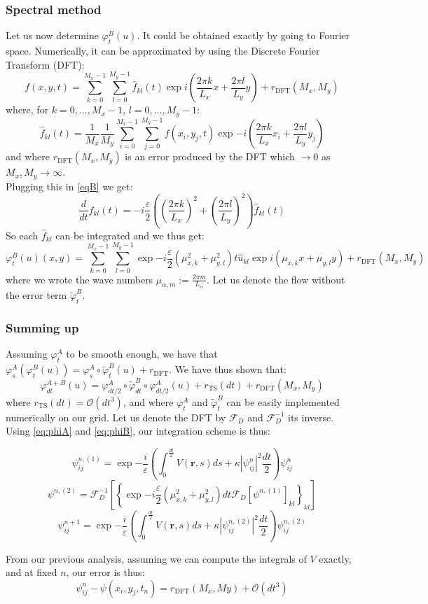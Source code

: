 \documentclass{article}
\begin{document}
\subsubsection*{Spectral method}
Let us now determine $\varphi^B_t(u)$. It could be obtained exactly by going to Fourier space. Numerically, it can be approximated by using the Discrete Fourier Transform (DFT):
$$
f(x,y,t)=\sum_{k=0}^{M_x-1}\sum_{l=0}^{M_y-1}\hat{f}_{kl}(t)\exp{i\left(\frac{2\pi k}{L_x}x+\frac{2\pi l}{L_y}y\right)}+r_\text{DFT}(M_x,M_y)
$$
where, for $k=0,..., M_x-1$, $l=0,..., M_y-1$:
$$
\hat{f}_{kl}(t)=\frac{1}{M_x}\frac{1}{M_y}\sum_{i=0}^{M_x-1}\sum_{j=0}^{M_y-1}f(x_i,y_j,t)\exp{-i\left(\frac{2\pi k}{L_x}x_i+\frac{2\pi l}{L_y}y_j\right)}
$$
and where $r_\text{DFT}(M_x,M_y)$ is an error produced by the DFT which $\longrightarrow0$ as $M_x,M_y\longrightarrow\infty$.\\
Plugging this in \eqref{eqB} we get:
$$
\frac{d}{dt}\hat{f}_{kl}(t)=-i\frac{\varepsilon}{2}\left(\left(\frac{2\pi k}{L_x}\right)^2+\left(\frac{2\pi l}{L_y}\right)^2\right)\hat{f}_{kl}(t)
$$
So each $\hat{f}_{kl}$ can be integrated and we thus get:
\begin{equation}\label{eq:phiB}
    \varphi^B_t(u)(x,y)=\sum_{k=0}^{M_x-1}\sum_{l=0}^{M_y-1}\exp{-i\frac{\varepsilon}{2}\left(\mu_{x,k}^2+\mu_{y,l}^2\right)t}\hat{u}_{kl}\exp{i\left(\mu_{x,k} x+\mu_{y,l} y\right)}+r_\text{DFT}(M_x,M_y)
\end{equation}
where we wrote the wave numbers $\mu_{\alpha,m}:=\frac{2\pi m}{L_\alpha}$. Let us denote the flow without the error term $\tilde{\varphi}_t^B$.

\subsubsection*{Summing up}
Assuming $\varphi_t^A$ to be smooth enough, we have that $\varphi_s^A(\varphi_t^B(u))=\varphi_s^A\circ\tilde{\varphi}_t^B(u)+r_\text{DFT}$. We have thus shown that:
$$\varphi^{A+B}_{dt}(u)=\varphi^A_{dt/2}\circ\tilde{\varphi}^B_{dt}\circ\varphi^A_{dt/2}(u)+r_\text{TS}(dt)+r_\text{DFT}(M_x,M_y)$$
where $r_\text{TS}(dt)=\mathcal{O}(dt^3)$, and where $\varphi^A_t$ and $\tilde {\varphi}^B_t$ can be easily implemented numerically on our grid. Let us denote the DFT by $\mathcal{F}_D$ and $\mathcal{F}_D^{-1}$ its inverse. Using \eqref{eq:phiA} and \eqref{eq:phiB}, our integration scheme is thus:
\begin{framed}
$$
\psi^{n,(1)}_{ij}=\exp{-\frac{i}{\varepsilon}\left(\int_0^\frac{dt}{2} V(\mathbf{r},s)ds +\kappa|\psi^n_{ij}|^{2}\frac{dt}{2}\right)}\psi^n_{ij}
$$
$$
\psi^{n,(2)}=\mathcal{F}_D^{-1}\left[\left\{\exp{-i\frac{\varepsilon}{2}\left(\mu_{x,k}^2+\mu_{y,l}^2\right)dt}\mathcal{F}_D\left[\psi^{n,(1)}\right]_{kl}\right\}_{kl}\right]
$$
$$
\psi^{n+1}_{ij}=\exp{-\frac{i}{\varepsilon}\left(\int_0^\frac{dt}{2} V(\mathbf{r},s)ds +\kappa|\psi^{n,(2)}_{ij}|^{2}\frac{dt}{2}\right)}\psi^{n,(2)}_{ij}
$$
\end{framed}
From our previous analysis, assuming we can compute the integrals of $V$ exactly, and at fixed $n$, our error is thus:
$$
\psi^n_{ij} -\psi(x_i,y_j,t_n)=r_\text{DFT}(M_x,My)+\mathcal{O}(dt^3)
$$
\end{document}
